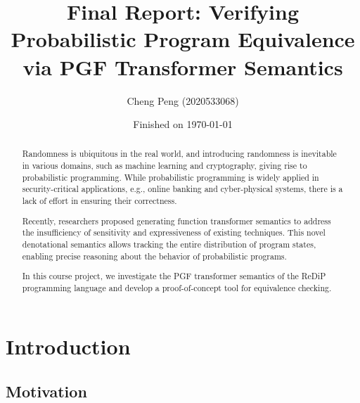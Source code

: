 \documentclass[a4paper]{article}
\title{Final Report: Verifying Probabilistic Program Equivalence via PGF Transformer Semantics}
\date{Finished on \today}
\author{Cheng Peng (2020533068)}
\begin{document}
\maketitle

\begin{abstract}
	Randomness is ubiquitous in the real world, and introducing randomness is inevitable in various domains, such as machine learning and cryptography, giving rise to probabilistic programming.
	While probabilistic programming is widely applied in security-critical applications, e.g., online banking and cyber-physical systems, there is a lack of effort in ensuring their correctness.\par
	Recently, researchers proposed generating function transformer semantics to address the insufficiency of sensitivity and expressiveness of existing techniques.
	This novel denotational semantics allows tracking the entire distribution of program states, enabling precise reasoning about the behavior of probabilistic programs.\par
	In this course project, we investigate the PGF transformer semantics of the ReDiP programming language and develop a proof-of-concept tool for equivalence checking.
\end{abstract}

\section{Introduction}

\subsection{Motivation}
\end{document}
